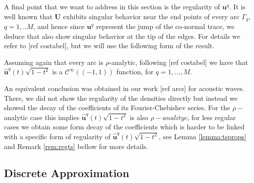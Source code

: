 \documentclass{article}
\newcommand{\todo}[1]{{\color{red}[#1]}}
\begin{document}
A final point that we want to address in this section is the regularity of $\mathbf{u}^q$. It is well known that $\mathbf{U}$ exhibits singular behavior near the end points of every arc $\Gamma_q$, $q=1,..M$, and hence since $\mathbf{u}^q$ represent the jump of the co-normal trace, we deduce that also show singular behavior at the tip of the edges. For details we refer to \todo{ref costabel}, but we will use the following form of the result.

 Assuming again that every arc is $\rho$-analytic, following \todo{ref costabel} we have that
$\widehat{\mathbf{u}}^q(t) \sqrt{1-t^2}$ is a $\mathcal{C}^\infty((-1,1))$ function, for $q = 1,\hdots,M$. 

An equivalent conclusion was obtained in our work  \todo{ref arcs} for acoustic waves. There, we did not show the regularity of the densities directly but instead we showed the decay of the coefficients of its Fourier-Chebishev series. For the $\rho-$analytic case this implies $\widehat{\mathbf{u}}^q(t) \sqrt{1-t^2}$ is also $\rho-analityc$, for less regular cases we obtain some form decay of the coefficients which is harder to be linked with a specific form of regularity of $\widehat{\mathbf{u}}^q(t) \sqrt{1-t^2}$, see Lemma \ref{lemma:tsprops} and Remark \ref{rem:regts} bellow for more details.  

\subsection{Discrete Approximation}
\end{document}
